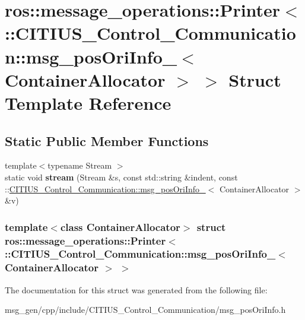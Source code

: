 \hypertarget{structros_1_1message__operations_1_1_printer_3_01_1_1_c_i_t_i_u_s___control___communication_1_1m5b96786edd1d39d1e238c4c780f824c2}{\section{ros\-:\-:message\-\_\-operations\-:\-:\-Printer$<$ \-:\-:\-C\-I\-T\-I\-U\-S\-\_\-\-Control\-\_\-\-Communication\-:\-:msg\-\_\-pos\-Ori\-Info\-\_\-$<$ \-Container\-Allocator $>$ $>$ \-Struct \-Template \-Reference}
\label{structros_1_1message__operations_1_1_printer_3_01_1_1_c_i_t_i_u_s___control___communication_1_1m5b96786edd1d39d1e238c4c780f824c2}
}
\subsection*{\-Static \-Public \-Member \-Functions}
\begin{DoxyCompactItemize}
\item 
\hypertarget{structros_1_1message__operations_1_1_printer_3_01_1_1_c_i_t_i_u_s___control___communication_1_1m5b96786edd1d39d1e238c4c780f824c2_adc65f5e4b76e8055f7ef5912189ac49c}{{\footnotesize template$<$typename Stream $>$ }\\static void {\bfseries stream} (\-Stream \&s, const std\-::string \&indent, const \-::\hyperlink{struct_c_i_t_i_u_s___control___communication_1_1msg__pos_ori_info__}{\-C\-I\-T\-I\-U\-S\-\_\-\-Control\-\_\-\-Communication\-::msg\-\_\-pos\-Ori\-Info\-\_\-}$<$ \-Container\-Allocator $>$ \&v)}\label{structros_1_1message__operations_1_1_printer_3_01_1_1_c_i_t_i_u_s___control___communication_1_1m5b96786edd1d39d1e238c4c780f824c2_adc65f5e4b76e8055f7ef5912189ac49c}

\end{DoxyCompactItemize}
\subsubsection*{template$<$class Container\-Allocator$>$ struct ros\-::message\-\_\-operations\-::\-Printer$<$ \-::\-C\-I\-T\-I\-U\-S\-\_\-\-Control\-\_\-\-Communication\-::msg\-\_\-pos\-Ori\-Info\-\_\-$<$ Container\-Allocator $>$ $>$}



\-The documentation for this struct was generated from the following file\-:\begin{DoxyCompactItemize}
\item 
msg\-\_\-gen/cpp/include/\-C\-I\-T\-I\-U\-S\-\_\-\-Control\-\_\-\-Communication/msg\-\_\-pos\-Ori\-Info.\-h\end{DoxyCompactItemize}
